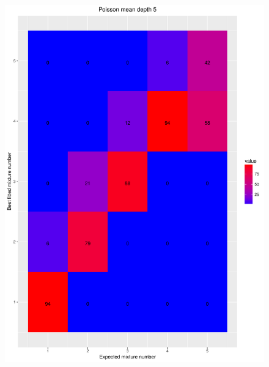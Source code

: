 \documentclass[11pt]{article}
\begin{document}
\begin{figure}[H]
\begin{center}
\includegraphics[scale=0.27]{../Results/Second_Analysis/Poisson_Confusion_Matrix_5.pdf}

\end{center}
\end{figure}
\end{document}
